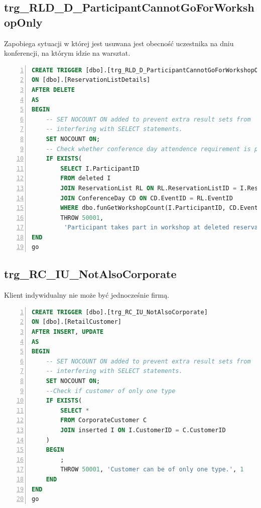 \documentclass[]{article}
\begin{document}
	\subsection{trg\_RLD\_D\_ParticipantCannotGoForWorkshopOnly}
Zapobiega sytuacji w której jest usuwana jest obecność uczestnika na dniu konferencji, na którym idzie na warsztat.
\begin{lstlisting}[language=SQL,
showspaces=false,
basicstyle=\ttfamily,
numbers=left,
numberstyle=\tiny,
tabsize=2,
backgroundcolor=\color{lightg},
keywordstyle=\color{lightblue},
commentstyle=\color{gray}]
CREATE TRIGGER [dbo].[trg_RLD_D_ParticipantCannotGoForWorkshopOnly]
ON [dbo].[ReservationListDetails]
AFTER DELETE
AS
BEGIN
	-- SET NOCOUNT ON added to prevent extra result sets from
	-- interfering with SELECT statements.
	SET NOCOUNT ON;
	-- Check whether conference day attendence requirement is present
	IF EXISTS(
		SELECT I.ParticipantID
		FROM deleted I
		JOIN ReservationList RL ON RL.ReservationListID = I.ReservationListID
		JOIN ConferenceDay CD ON CD.EventID = RL.EventID
		WHERE dbo.funGetWorkshopCount(I.ParticipantID, CD.EventID) > 0)
		THROW 50001,
		 'Participant takes part in workshop at deleted reservation day.', 1
END
go
\end{lstlisting}

	\subsection{trg\_RC\_IU\_NotAlsoCorporate}
Klient indywidualny nie może być jednocześnie firmą.
\begin{lstlisting}[language=SQL,
showspaces=false,
basicstyle=\ttfamily,
numbers=left,
numberstyle=\tiny,
tabsize=2,
backgroundcolor=\color{lightg},
keywordstyle=\color{lightblue},
commentstyle=\color{gray}]
CREATE TRIGGER [dbo].[trg_RC_IU_NotAlsoCorporate]
ON [dbo].[RetailCustomer]
AFTER INSERT, UPDATE
AS
BEGIN
	-- SET NOCOUNT ON added to prevent extra result sets from
	-- interfering with SELECT statements.
	SET NOCOUNT ON;
	--Check if customer of only one type 
	IF EXISTS(
		SELECT *
		FROM CorporateCustomer C
		JOIN inserted I ON I.CustomerID = C.CustomerID
	)
	BEGIN
		;
		THROW 50001, 'Customer can be of only one type.', 1
	END
END
go

\end{lstlisting}
\end{document}

